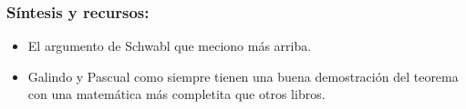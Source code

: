 \documentclass{beamer}
\begin{document}
\begin{frame}
\frametitle{Síntesis y recursos:}

\begin{itemize}
\item El argumento de Schwabl que meciono más arriba.
\item Galindo y Pascual como siempre tienen una buena demostración del teorema con una matemática más completita que otros libros.  
\end{itemize}
\end{frame}
\end{document}
